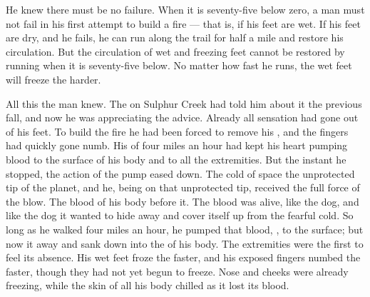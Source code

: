 \documentclass{fiche}
\begin{document}
\begin{texte}
He knew there must be no failure. When it is seventy-five below zero, a man must not fail in
his first attempt to build a fire --- that is, if his feet are wet. If his feet are dry, and
he fails, he can run along the trail for half a mile and restore his circulation. But the
circulation of wet and freezing feet cannot be restored by running when it is seventy-five
below. No matter how fast he runs, the wet feet will freeze the harder.

All this the man knew. The  on
Sulphur Creek had told him about it the previous fall, and now he was appreciating the
advice. Already all sensation had gone out of his feet. To build the fire he had been forced
to remove his , and the fingers had quickly gone numb. His
 of four miles an hour had kept his heart pumping blood
to the surface of his body and to all the extremities. But the instant he stopped, the action
of the pump eased down. The cold of space  the unprotected
tip of the planet, and he, being on that unprotected tip, received the full force of the blow.
The blood of his body  before it. The blood was alive, like
the dog, and like the dog it wanted to hide away and cover itself up from the fearful cold. So
long as he walked four miles an hour, he pumped that blood,
, to the surface; but now it
 away and sank down into the  of his body. The extremities were the first to feel its absence. His wet
feet froze the faster, and his exposed fingers numbed the faster, though they had not yet
begun to freeze. Nose and cheeks were already freezing, while the skin of all his body
chilled as it lost its blood.


\end{texte}
\end{document}
